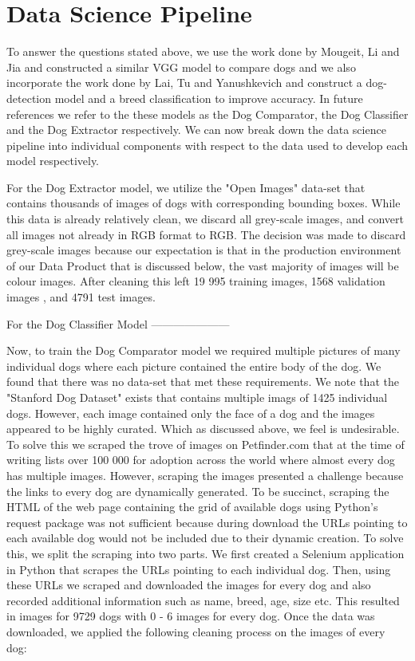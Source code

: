 \documentclass{article}
\begin{document}
\section{Data Science Pipeline}

To answer the questions stated above, we use the work done by Mougeit, Li and Jia and constructed a similar VGG model to compare dogs and we also incorporate the work done by Lai, Tu and Yanushkevich and construct a dog-detection model and a breed classification to improve accuracy.  In future references we refer to the these models as the Dog Comparator, the Dog Classifier and the Dog Extractor respectively.   We can now break down the data science pipeline into individual components with respect to the data used to develop each model respectively.

For the Dog Extractor model, we utilize the "Open Images" data-set that contains thousands of images of dogs with corresponding bounding boxes.  While this data is already relatively clean, we discard all grey-scale images, and convert all images not already in RGB format to RGB.  The decision was made to discard grey-scale images because our expectation is that in the production environment of our Data Product that is discussed below, the vast majority of images will be colour images.  After cleaning this left 19 995 training images, 1568 validation images , and 4791 test images.

For the Dog Classifier Model ---------------------

Now, to train the Dog Comparator model we required multiple pictures of many individual dogs where each picture contained the entire body of the dog.  We found that there was no data-set that met these requirements.  We note that the "Stanford Dog Dataset" exists that contains multiple imags of 1425 individual dogs.  However, each image contained only the face of a dog and the images appeared to be highly curated.  Which as discussed above, we feel is undesirable.  To solve this we scraped the trove of images on Petfinder.com that at the time of writing lists over 100 000 for adoption across the world where almost every dog has multiple images.  However, scraping the images presented a challenge because the links to every dog are dynamically generated.  To be succinct, scraping the HTML of the web page containing the grid of available dogs using Python's request package was not sufficient because during download the URLs pointing to each available dog would not be included due to their dynamic creation.  To solve this, we split the scraping into two parts.  We first created a Selenium application in Python that scrapes the URLs pointing to each individual dog.  Then, using these URLs we scraped and downloaded the images for every dog and also recorded additional information such as name, breed, age, size etc.  This resulted in images for 9729 dogs with 0 - 6 images for every dog.  Once the data was downloaded, we applied the following cleaning process on the images of every dog:
\end{document}
